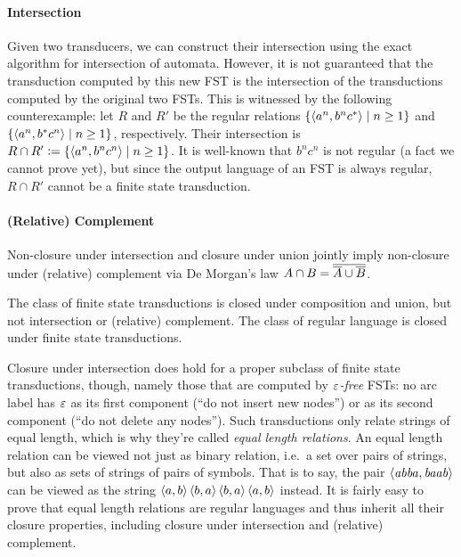 \paragraph{Intersection}
Given two transducers, we can construct their intersection using the exact algorithm for intersection of automata.
However, it is not guaranteed that the transduction computed by this new FST is the intersection of the transductions computed by the original two FSTs.
This is witnessed by the following counterexample: let $R$ and $R'$ be the regular relations $\left \{ \left \langle a^n, b^n c^* \right \rangle  \mid n \geq 1 \right \}$ and $\left \{ \left \langle a^n, b^* c^n \right \rangle  \mid n \geq 1 \right \}$, respectively.
Their intersection is $R \cap R' \mathrel{\mathop:}= \left \{  \left \langle a^n, b^n c^n \right \rangle  \mid n \geq 1 \right \}$.
It is well-known that $b^n c^n$ is not regular (a fact we cannot prove yet), but since the output language of an FST is always regular, $R \cap R'$ cannot be a finite state transduction.

\paragraph{(Relative) Complement}
Non-closure under intersection and closure under union jointly imply non-closure under (relative) complement via De Morgan's law $A \cap B =  \overline{ \overline{A}  \cup  \overline{B} } $.

\begin{theorem}
    The class of finite state transductions is closed under composition and union, but not intersection or (relative) complement.
    The class of regular language is closed under finite state transductions.
\end{theorem}
%
Closure under intersection does hold for a proper subclass of finite state transductions, though, namely those that are computed by \emph{$\varepsilon$-free} FSTs: no arc label has $\varepsilon$ as its first component (``do not insert new nodes'') or as its second component (``do not delete any nodes'').
Such transductions only relate strings of equal length, which is why they're called \emph{equal length relations}.
An equal length relation can be viewed not just as binary relation, i.e.\ a set over pairs of strings, but also as sets of strings of pairs of symbols.
That is to say, the pair $\left \langle \mathit{abba},\mathit{baab} \right \rangle $ can be viewed as the string $\left \langle a,b \right \rangle \left \langle b,a \right \rangle \left \langle b,a \right \rangle \left \langle a,b \right \rangle $ instead.
It is fairly easy to prove that equal length relations are regular languages and thus inherit all their closure properties, including closure under intersection and (relative) complement.



